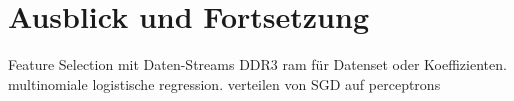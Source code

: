\chapter{Ausblick und Fortsetzung}
Feature Selection mit Daten-Streams\cite{FS}
DDR3 ram für Datenset oder Koeffizienten.
multinomiale logistische regression.
verteilen von SGD auf perceptrons
